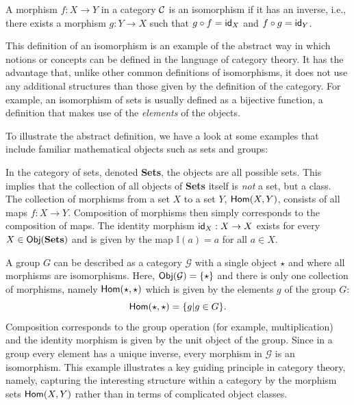 	\begin{defn}[Isomorphism]
		A morphism $f:X\to Y$ in a category ${\mathcal{C}}$ is an isomorphism if it has an inverse, i.e., there exists a morphism $g:Y\to X$ such that $g\circ f=\mathsf{id}_X$ and $f\circ g=\mathsf{id}_Y$.
	\end{defn}
	This definition of an isomorphism is an example of the abstract way in which notions or concepts can be defined in the language of category theory. It has the advantage that, unlike other common definitions of isomorphisms, it does not use any additional structures than those given by the definition of the category. For example, an isomorphism of sets is usually defined as a bijective function, a definition that makes use of the \textit{elements} of the objects. 
	
	To illustrate the abstract definition, we have a look at some examples that include familiar mathematical objects such as sets and groups:
	
	\begin{exmp}
		\label{ex:sets}
		In the category of sets, denoted \textbf{Sets}, the objects are all possible sets. This implies that the collection of all objects of \textbf{Sets} itself is \emph{not} a set, but a class. The collection of morphisms from a set $X$ to a set $Y$, $\mathsf{Hom}(X,Y)$, consists of all maps $f:X\to Y$. Composition of morphisms then simply corresponds to the composition of maps. The identity morphism $\mathsf{id}_X:X\to X$ exists for every $X\in\mathsf{Obj}(\mathbf{Sets})$ and is given by the map $\mathbb{I}(a)=a$ for all $a\in X$.
	\end{exmp}

	\begin{exmp}[Group]
		\label{ex:grp}
		A group $G$ can be described as a category $\mathcal{G}$ with a single object $\star$ and where all morphisms are isomorphisms. Here, $\mathsf{Obj}(\mathcal{G})=\{\star\}$ and there is only one collection of morphisms, namely $\mathsf{Hom}(\star,\star)$ which is given by the elements $g$ of the group $G$:
			\begin{equation}
				\mathsf{Hom}(\star,\star)=\{g|g\in G\}.
			\end{equation}
		Composition corresponds to the group operation (for example, multiplication) and the identity morphism is given by the unit object of the group. Since in a group every element has a unique inverse, every morphism in $\mathcal{G}$ is an isomorphism. This example illustrates a key guiding principle in category theory, namely, capturing the interesting structure within a category by the morphism sets $\mathsf{Hom}(X,Y)$ rather than in terms of complicated object classes.
	\end{exmp}


